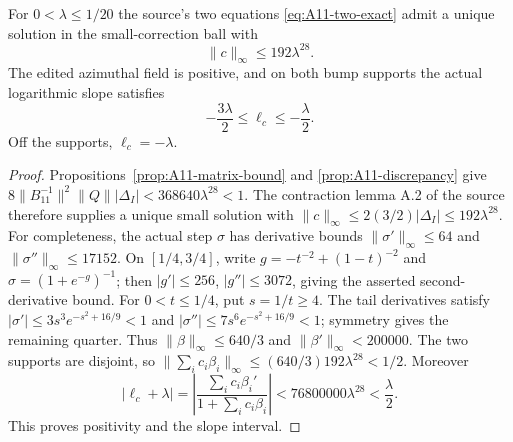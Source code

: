 \begin{theorem}
\label{thm:A11-true-corrections}
For $0<\lambda\le1/20$ the source's two equations
\eqref{eq:A11-two-exact} admit a unique solution in the
small-correction ball with
\begin{equation}\label{eq:A11-c-coeff}
 \|c\|_\infty\le192\lambda^{28}.
\end{equation}
The edited azimuthal field is positive, and on both bump
supports the actual logarithmic slope satisfies
\begin{equation}\label{eq:A11-slope}
 -\frac{3\lambda}{2}\le\ell_c\le-\frac\lambda2.
\end{equation}
Off the supports, $\ell_c=-\lambda$.
\end{theorem}
\begin{proof}
Propositions~\ref{prop:A11-matrix-bound} and
\ref{prop:A11-discrepancy} give
$8\|B_{11}^{-1}\|^2\|Q\||\Delta_I|
 <368640\lambda^{28}<1$. The contraction lemma A.2
of the source therefore supplies a unique small solution
with $\|c\|_\infty\le2(3/2)|\Delta_I|
\le192\lambda^{28}$.
For completeness, the actual step $\sigma$ has derivative
bounds $\|\sigma'\|_\infty\le64$ and
$\|\sigma''\|_\infty\le17152$.
On $[1/4,3/4]$, write
$g=-t^{-2}+(1-t)^{-2}$ and
$\sigma=(1+e^{-g})^{-1}$; then
$|g'|\le256$, $|g''|\le3072$, giving the asserted
second-derivative bound. For $0<t\le1/4$, put $s=1/t\ge4$.
The tail derivatives satisfy
$|\sigma'|\le3s^3e^{-s^2+16/9}<1$ and
$|\sigma''|\le7s^6e^{-s^2+16/9}<1$;
symmetry gives the remaining quarter.
Thus $\|\beta\|_\infty\le640/3$ and
$\|\beta'\|_\infty<200000$.
The two supports are disjoint, so
$\|\sum_i c_i\beta_i\|_\infty
\le(640/3)192\lambda^{28}<1/2$.
Moreover
\[
 |\ell_c+\lambda|
 =\left|\frac{\sum_i c_i\beta_i'}{1+\sum_i c_i\beta_i}\right|
 <76800000\lambda^{28}<\frac\lambda2.
\]
This proves positivity and the slope interval.
\end{proof}

